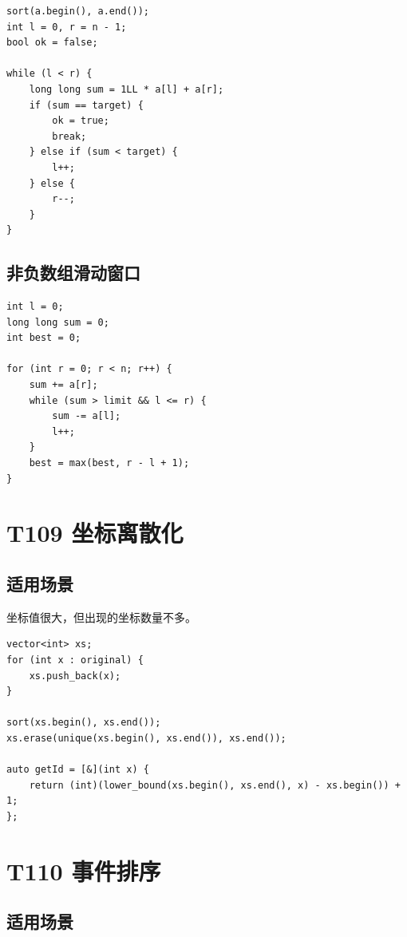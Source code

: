 \begin{lstlisting}
sort(a.begin(), a.end());
int l = 0, r = n - 1;
bool ok = false;

while (l < r) {
    long long sum = 1LL * a[l] + a[r];
    if (sum == target) {
        ok = true;
        break;
    } else if (sum < target) {
        l++;
    } else {
        r--;
    }
}
\end{lstlisting}

\subsection{非负数组滑动窗口}

\begin{lstlisting}
int l = 0;
long long sum = 0;
int best = 0;

for (int r = 0; r < n; r++) {
    sum += a[r];
    while (sum > limit && l <= r) {
        sum -= a[l];
        l++;
    }
    best = max(best, r - l + 1);
}
\end{lstlisting}


\section{T109 坐标离散化}\label{sec:09-11}\label{tpl:109}

\subsection{适用场景}

坐标值很大，但出现的坐标数量不多。

\begin{lstlisting}
vector<int> xs;
for (int x : original) {
    xs.push_back(x);
}

sort(xs.begin(), xs.end());
xs.erase(unique(xs.begin(), xs.end()), xs.end());

auto getId = [&](int x) {
    return (int)(lower_bound(xs.begin(), xs.end(), x) - xs.begin()) + 1;
};
\end{lstlisting}


\section{T110 事件排序}\label{sec:09-12}\label{tpl:110}

\subsection{适用场景}

